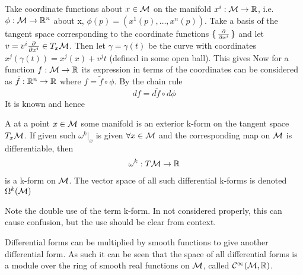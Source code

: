 \documentclass{article}
\begin{document}
\begin{example}
Take coordinate functions about $x\in\mathcal{M}$ on the manifold $x^i : \mathcal{M} \to \mathbb{R}$, i.e. $\phi:\mathcal{M}\to\mathbb{R}^n$ about x, $\phi(p)=(x^1(p),\dots,x^n(p))$. Take a basis of the tangent space corresponding to the coordinate functions $\set{ \frac{\partial}{\partial x^i} }$ and let $v=v^i \frac{\partial}{\partial x^i}\in T_x \mathcal{M}$. Then let $\gamma=\gamma(t)$ be the curve with coordinates $x^j(\gamma(t)) = x^j(x) + v^j t $ (defined in some open ball). This gives
Now for a function $f:\mathcal{M}\to\mathbb{R}$ its expression in terms of the coordinates can be considered as $\tilde{f}:\mathbb{R}^n \to \mathbb{R}$ where $f=\tilde{f} \circ \phi$. By the chain rule 
\[
df = d\tilde{f} \circ d\phi
\]
It is known 
and hence 
\end{example}

\begin{definition}
A  at a point $x\in\mathcal{M}$ some manifold is an exterior k-form on the tangent space $T_x\mathcal{M}$. If given such $\omega^k\rvert_x$ is given $\forall x\in \mathcal{M}$ and the corresponding map on $\mathcal{M}$ is differentiable, then
\begin{align*}
    \omega^k : T\mathcal{M} \to \mathbb{R}
\end{align*}
is a k-form on $\mathcal{M}$. The vector space of all such differential k-forms is denoted $\Omega^k(\mathcal{M})$
\end{definition}

\begin{remark}
Note the double use of the term k-form. In not considered properly, this can cause confusion, but the use should be clear from context. 
\end{remark}

\begin{fact}
Differential forms can be multiplied by smooth functions to give another differential form. As such it can be seen that the space of all differential forms is a module over the ring of smooth real functions on $\mathcal{M}$, called $\mathcal{C}^\infty(\mathcal{M},\mathbb{R})$.
\end{fact}
\end{document}
